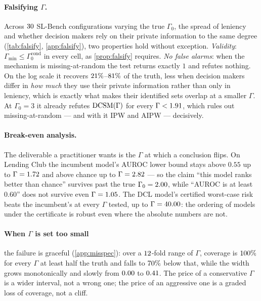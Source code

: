 \paragraph{Falsifying $\Gamma$.} Across $30$ SL-Bench
configurations varying the true $\Gamma_0$, the spread of leniency and whether
decision makers rely on their private information to the same degree
(\cref{tab:falsify}, \cref{app:falsify}), two properties hold without
exception. \emph{Validity}: $\Gamma_{\min}\le\Gamma_0^{\mathrm{cond}}$ in every
cell, as \cref{prop:falsify} requires. \emph{No false alarms}: when the
mechanism is missing-at-random the test returns exactly $1$ and refutes
nothing. On the log scale it recovers $21\%$--$81\%$
of the truth, less when decision makers differ in \emph{how much} they use
their private information rather than only in leniency, which is exactly what
makes their identified sets overlap at a smaller $\Gamma$. At $\Gamma_0=3$ it
already refutes $\textup{DCSM}(\Gamma)$ for every $\Gamma<1.91$, which
rules out missing-at-random --- and with it IPW and AIPW --- decisively.

\paragraph{Break-even analysis.} The deliverable a practitioner wants is the
$\Gamma$ at which a conclusion flips. On Lending Club the incumbent model's
AUROC lower bound stays above $0.55$ up to $\Gamma=1.72$
and above chance up to $\Gamma=2.82$ --- so the
claim ``this model ranks better than chance'' survives past the true
$\Gamma_0=2.00$, while ``AUROC is at least $0.60$'' does
not survive even $\Gamma=1.05$. The DCL model's
certified worst-case risk beats the incumbent's at every $\Gamma$ tested, up to
$\Gamma=40.00$: the ordering of models under the
certificate is robust even where the absolute numbers are not.

\paragraph{When $\Gamma$ is set too small} the failure is graceful
(\cref{app:misspec}): over a $12$-fold range of $\Gamma$,
coverage is $100\%$ for every $\Gamma$ at least half the truth
and falls to $70\%$ below that, while the width grows
monotonically and slowly from $0.00$ to $0.41$.
The price of a conservative $\Gamma$ is a wider interval, not a wrong one; the
price of an aggressive one is a graded loss of coverage, not a cliff.

